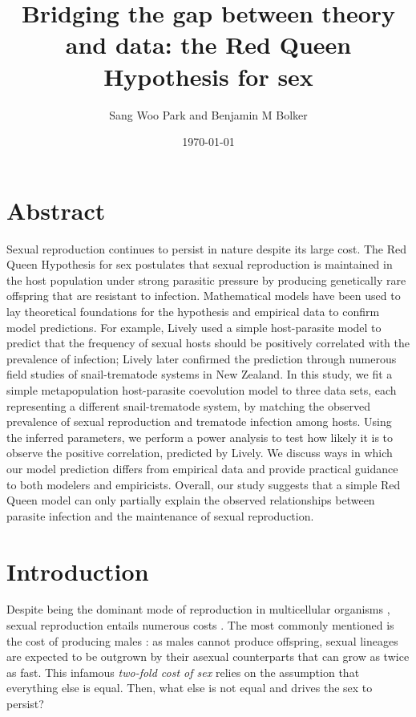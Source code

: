 \documentclass{article}\usepackage[]{graphicx}\usepackage[]{color}
\title{Bridging the gap between theory and data: the Red Queen Hypothesis for sex}
\author{Sang Woo Park and Benjamin M Bolker}
\date{\today}
\begin{document}
\maketitle

\section*{Abstract}

Sexual reproduction continues to persist in nature despite its large cost.
The Red Queen Hypothesis for sex postulates that sexual reproduction is maintained in the host population under strong parasitic pressure by producing genetically rare offspring that are resistant to infection.
Mathematical models have been used to lay theoretical foundations for the hypothesis and empirical data to confirm model predictions.
For example, Lively used a simple host-parasite model to predict that the frequency of sexual hosts should be positively correlated with the prevalence of infection; Lively later confirmed the prediction through numerous field studies of snail-trematode systems in New Zealand.
In this study, we fit a simple metapopulation host-parasite coevolution model to three data sets, each representing a different snail-trematode system, by matching the observed prevalence of sexual reproduction and trematode infection among hosts.
Using the inferred parameters, we perform a power analysis to test how likely it is to observe the positive correlation, predicted by Lively.
We discuss ways in which our model prediction differs from empirical data and provide practical guidance to both modelers and empiricists.
Overall, our study suggests that a simple Red Queen model can only partially explain the observed relationships between parasite infection and the maintenance of sexual reproduction.

\section{Introduction}

Despite being the dominant mode of reproduction in multicellular organisms \citep{vrijenhoek1998animal}, sexual reproduction entails numerous costs \citep{lehtonen2012many}.
The most commonly mentioned is the cost of producing males \citep{smith1978evolution}:
as males cannot produce offspring, sexual lineages are expected to be outgrown by their asexual counterparts that can grow as twice as fast.
This infamous \emph{two-fold cost of sex} \citep{smith1978evolution} relies on the assumption that everything else is equal.
Then, what else is not equal and drives the sex to persist?
\end{document}
